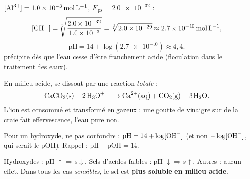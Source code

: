\documentclass[11pt,a4paper]{article}
\begin{document}
\begin{exemplebox}
$[\ce{Al^{3+}}]=\qty{1.0e-3}{\mole\per\litre}$, $K_{\mathrm{ps}}=\num{2.0e-32}$ :
\[ [\ce{OH-}]=\sqrt[3]{\dfrac{\num{2.0e-32}}{\num{1.0e-3}}}=\sqrt[3]{\num{2.0e-29}}\approx\qty{2.7e-10}{\mole\per\litre}, \]
\[ \mathrm{pH}=14+\log(\num{2.7e-10})\approx 4{,}4. \]
 précipite dès que l'eau cesse d'être franchement acide (floculation dans le traitement des
eaux).
\end{exemplebox}

\begin{exemplebox}
En milieu acide,  se dissout par une réaction \emph{totale} :
\[ \ce{CaCO3(s) + 2 H3O+ -> Ca^{2+}(aq) + CO2(g) + 3 H2O}. \]
L'ion  est consommé et transformé en  gazeux : une goutte de vinaigre sur de la
craie fait effervescence, l'eau pure non.
\end{exemplebox}

\begin{piege}[pH ou pOH ?]
Pour un hydroxyde, ne pas confondre : $\mathrm{pH}=14+\log[\ce{OH-}]$ (et non $-\log[\ce{OH-}]$, qui
serait le pOH). Rappel : $\mathrm{pH}+\mathrm{pOH}=14$.
\end{piege}

\begin{remarque}
Hydroxydes : pH $\uparrow\Rightarrow s\downarrow$. Sels d'acides faibles : pH $\downarrow\Rightarrow
s\uparrow$. Autres : aucun effet. Dans tous les cas \emph{sensibles}, le sel est \textbf{plus soluble en
milieu acide}.
\end{remarque}
\end{document}
